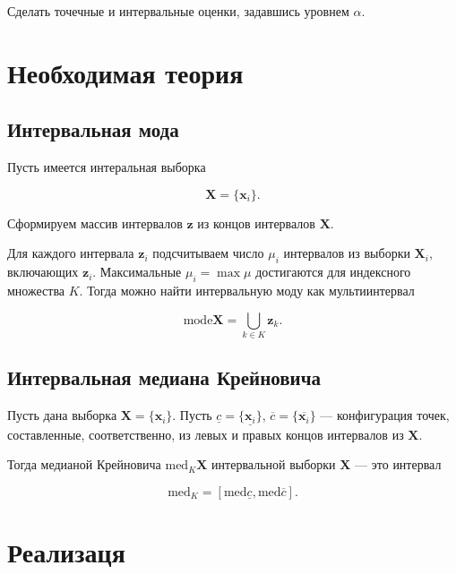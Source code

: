 \documentclass{article}
\begin{document}
  Сделать точечные и интервальные оценки, задавшись уровнем \( \alpha \).

  \section{Необходимая теория}

  \subsection{Интервальная мода}

  Пусть имеется интеральная выборка

  \[
    \mathbf{X} = \{ \mathbf{x}_i \}.
  \]

  Сформируем массив интервалов \( \mathbf{z} \) из концов интервалов
  \( \mathbf{X} \).

  Для каждого интервала \( \mathbf{z}_i \) подсчитываем число \( \mu_i \)
  интервалов из выборки \( \mathbf{X}_i \), включающих \( \mathbf{z}_i \).
  Максимальные \( \mu_i = \max \mu \) достигаются для индексного множества
  \( K \). Тогда можно найти интервальную моду как мультиинтервал

  \begin{equation}
    \text{mode} \mathbf{X} = \bigcup_{k \in K} \mathbf{z}_k.
  \end{equation}

  \subsection{Интервальная медиана Крейновича}

  Пусть дана выборка \( \mathbf{X} = \{ \mathbf{x}_i \} \). Пусть
  \( \underline c = \{ \underline{\mathbf{x}_i} \} \),
  \( \overline c = \{ \overline{\mathbf{x}_i} \} \) --- конфигурация
  точек, составленные, соответственно, из левых и правых концов интервалов
  из \( \mathbf{X} \).

  Тогда медианой Крейновича \( \text{med}_K \mathbf{X} \) интервальной
  выборки \( \mathbf{X} \) --- это интервал

  \begin{equation}
    \text{med}_K = [\text{med} \underline c, \text{med} \overline c].
  \end{equation}

  \section{Реализаця}
\end{document}
